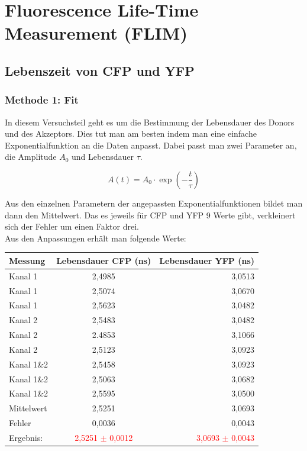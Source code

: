 \section{Fluorescence Life-Time Measurement (FLIM)}

\subsection{Lebenszeit von CFP und YFP}

\subsubsection{Methode 1: Fit}
In diesem Versuchsteil geht es um die Bestimmung der Lebensdauer des Donors und des Akzeptors. Dies tut man am 
besten indem man eine einfache Exponentialfunktion an die Daten anpasst. Dabei passt man zwei Parameter an, die Amplitude $A_0$ und 
Lebensdauer $\tau$.

\begin{equation}
    A(t) = A_0 \cdot \exp(-\frac{t}{\tau})
\end{equation}

Aus den einzelnen Parametern der angepassten Exponentialfunktionen bildet man dann den Mittelwert. Das es jeweils für CFP und YFP 9 Werte gibt, 
verkleinert sich der Fehler um einen Faktor drei.\\
Aus den Anpassungen erhält man folgende Werte:\\

\begin{center}
    \centering
    \begin{tabular}{l|cr}
        \toprule
        Messung & Lebensdauer CFP (ns)& Lebensdauer YFP (ns)\\
        \midrule
        Kanal 1 & 2,4985& 3,0513\\
        Kanal 1 & 2,5074& 3,0670\\
        Kanal 1 & 2,5623& 3,0482\\
        \midrule
        Kanal 2 & 2,5483& 3,0482\\
        Kanal 2 & 2.4853& 3,1066\\
        Kanal 2 & 2,5123& 3,0923\\
        \midrule
        Kanal 1\&2 & 2,5458& 3,0923\\
        Kanal 1\&2 & 2,5063& 3,0682\\
        Kanal 1\&2 & 2,5595& 3,0500\\
        \midrule
        Mittelwert & 2,5251& 3,0693\\
        Fehler& 0,0036& 0,0043\\
        Ergebnis:& \textcolor{red}{2,5251 $\pm$ 0,0012}& \textcolor{red}{3,0693 $\pm$ 0,0043}\\
        \bottomrule
    \end{tabular}
\end{center}

